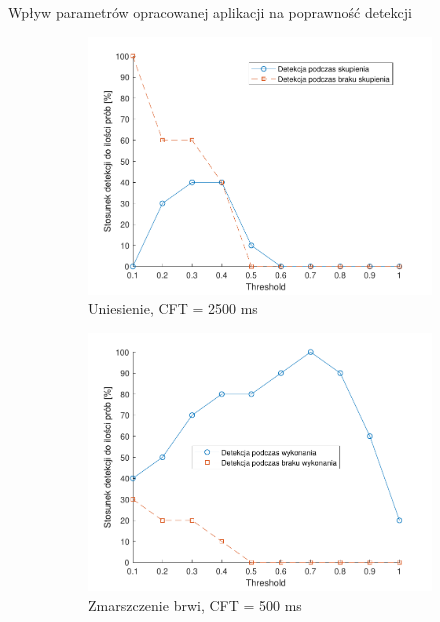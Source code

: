 \documentclass[10pt,aspectratio=169]{beamer}
\begin{document}
\begin{frame}{Wpływ parametrów opracowanej aplikacji na poprawność detekcji}
\begin{figure}[htb]
    \begin{subfigure}{0.3\linewidth}
    \includegraphics[width=\linewidth,keepaspectratio]{obrazy/up2500}
    \caption{Uniesienie, CFT = 2500 ms}
    \end{subfigure}
    \medskip
    \begin{subfigure}{0.3\linewidth}
    \includegraphics[width=\linewidth,keepaspectratio]{obrazy/frown500}
    \caption{Zmarszczenie brwi, CFT = 500 ms}
    \end{subfigure}\hspace*{\fill}
    \begin{subfigure}{0.3\linewidth}

\end{subfigure}
\end{figure}
\end{frame}
\end{document}
